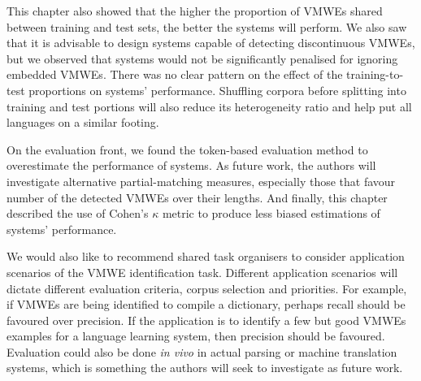 \documentclass[output=paper
,modfonts
,nonflat,draftmode]{langsci/langscibook}
\begin{document}
This chapter also showed that the higher the proportion of VMWEs shared between training and test sets, the better the systems will perform. 
We also saw that it is advisable to design systems capable of detecting discontinuous VMWEs, but we observed that systems would not be significantly penalised for ignoring embedded VMWEs. There was no clear pattern on the effect of the training-to-test proportions on systems' performance. 
Shuffling corpora before splitting into training and test portions will also reduce its heterogeneity
 ratio and help put all languages on a similar footing. 

On the evaluation front, we found the token-based evaluation method to overestimate the performance of systems. As future work, the authors will investigate alternative partial-matching measures, especially those that favour number of the detected VMWEs over their lengths. And finally, this chapter described the use of Cohen's $\kappa$ metric to produce less biased estimations of systems' performance.




We would also like to recommend shared task organisers to consider application scenarios of the VMWE identification task. Different application scenarios will dictate different evaluation criteria, corpus selection and priorities. For example, if VMWEs are being identified to compile a dictionary, perhaps recall should be favoured over precision. If the application is to identify a few but good VMWEs examples for a language learning system, then precision should be favoured. Evaluation could also be done \emph{in vivo} in actual parsing or machine translation systems, which is something the authors will seek to investigate as future work.
\end{document}
